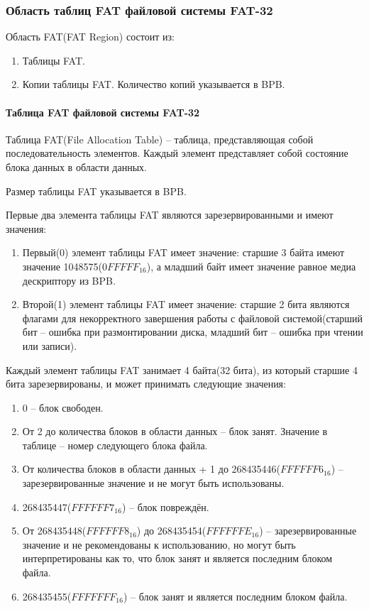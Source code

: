 \subsubsection{Область таблиц FAT файловой системы FAT-32}

Область FAT(FAT Region) состоит из:

\begin{enumerate}
\item Таблицы FAT.
\item Копии таблицы FAT. Количество копий указывается в BPB.
\end{enumerate}

\paragraph{Таблица FAT файловой системы FAT-32}

Таблица FAT(File Allocation Table) -- таблица, представляющая собой последовательность элементов. Каждый элемент представляет собой состояние блока данных в области данных.

Размер таблицы FAT указывается в BPB.

Первые два элемента таблицы FAT являются зарезервированными и имеют значения:

\begin{enumerate}
\item Первый(0) элемент таблицы FAT имеет значение: старшие 3 байта имеют значение 1048575($0FFFFF_{16}$), а младший байт имеет значение равное медиа дескриптору из BPB.
\item Второй(1) элемент таблицы FAT имеет значение: старшие 2 бита являются флагами для некорректного завершения работы с файловой системой(старший бит -- ошибка при размонтировании диска, младший бит -- ошибка при чтении или записи).
\end{enumerate}

Каждый элемент таблицы FAT занимает 4 байта(32 бита), из который старшие 4 бита зарезервированы, и может принимать следующие значения:

\begin{enumerate}
\item 0 -- блок свободен.
\item От 2 до количества блоков в области данных -- блок занят. Значение в таблице -- номер следующего блока файла.
\item От количества блоков в области данных + 1 до 268435446($FFFFFF6_{16}$) -- зарезервированные значение и не могут быть использованы.
\item 268435447($FFFFFF7_{16}$) -- блок повреждён.
\item От 268435448($FFFFFF8_{16}$) до 268435454($FFFFFFE_{16}$) -- зарезервированные значение и не рекомендованы к использованию, но могут быть интерпретированы как то, что блок занят и является последним блоком файла.
\item 268435455($FFFFFFF_{16}$) -- блок занят и является последним блоком файла.
\end{enumerate}


